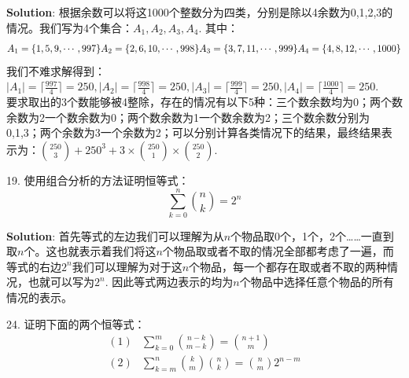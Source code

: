 \documentclass[a4paper]{ctexart}
\begin{document}
	\textbf{Solution}: 根据余数可以将这1000个整数分为四类，分别是除以4余数为0,1,2,3的情况。我们写为4个集合：$A_1,A_2,A_3,A_4$. 其中：
	\[ 
	A_1 = \{1,5,9,\cdots,997 \}\\
	A_2 = \{2,6,10,\cdots,998\}\\
	A_3 = \{3,7,11,\cdots,999\}\\
	A_4 = \{4,8,12,\cdots,1000\}\\
	 \]
	 我们不难求解得到：$|A_1|=\lceil \frac{997}{4} \rceil=250, |A_2|=\lceil \frac{998}{4} \rceil=250,|A_3|=\lceil \frac{999}{4} \rceil=250,|A_4|=\lceil \frac{1000}{4} \rceil=250$. \\
	 要求取出的3个数能够被4整除，存在的情况有以下5种：三个数余数均为0；两个数余数为2一个数余数为0；两个数余数为1一个数余数为2；三个数余数分别为0,1,3；两个余数为3一个余数为2；可以分别计算各类情况下的结果，最终结果表示为：$\binom{250}{3}+250^3+3\times \binom{250}{1}\times \binom{250}{2}$.
	 
	 19. 使用组合分析的方法证明恒等式：
	 \[ \sum_{k=0}^n \binom{n}{k}=2^n \]
	 
	 \textbf{Solution}: 首先等式的左边我们可以理解为从$n$个物品取0个，1个，2个……一直到取$n$个。这也就表示着我们将这$n$个物品取或者不取的情况全部都考虑了一遍，而等式的右边$2^n$我们可以理解为对于这$n$个物品，每一个都存在取或者不取的两种情况，也就可以写为$2^n$. 因此等式两边表示的均为$n$个物品中选择任意个物品的所有情况的表示。
	 
	 24. 证明下面的两个恒等式：
	 \[
	 \begin{aligned}
	 (1) & \sum_{k=0}^{m}\binom{n-k}{m-k}=\binom{n+1}{m}\\
	 (2) & \sum_{k=m}^n\binom{k}{m}\binom{n}{k} = \binom{n}{m} 2^{n-m}
	 \end{aligned}
	 \]
	 
\end{document}
